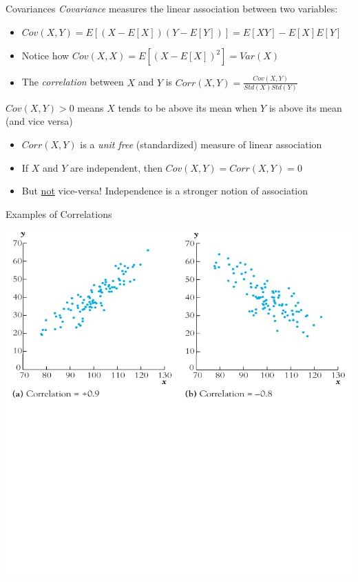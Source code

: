\documentclass[11pt,english,handout]{beamer}
\begin{document}
\begin{frame}{Covariances}
\vspace{0.2cm}
\emph{Covariance} measures the linear association between two variables: 

\begin{itemize}
\item $Cov(X,Y)=E\left[(X-E[X])(Y-E[Y])\right]=E[XY]-E[X]E[Y]$
\vspace{0.1cm}\pause{}
\item Notice how $Cov(X,X)=E\left[(X-E[X])^2\right]=Var(X)$
\vspace{0.1cm}\pause{}
\item The \emph{correlation} between $X$ and $Y$ is $Corr(X,Y)=\frac{Cov(X,Y)}{Std(X)Std(Y)}$
\end{itemize}
\vspace{0.3cm}
\pause{}

$Cov(X,Y)>0$ means $X$ tends to be above its mean when $Y$ is above its mean (and vice versa)\pause{}

\begin{itemize}
\item $Corr(X,Y)$ is a \emph{unit free} (standardized) measure of linear association
\vspace{0.1cm}\pause{}
\item If $X$ and $Y$ are independent, then $Cov(X,Y)=Corr(X,Y)=0$
\vspace{0.1cm}\pause{}
\item But \uline{not} vice-versa! Independence is a stronger notion of association 
\end{itemize}

\end{frame}

\begin{frame}{Examples of Correlations}

\begin{center}
\includegraphics[scale=0.35]{corr2.png} 
\end{center}

\end{frame}
\end{document}
